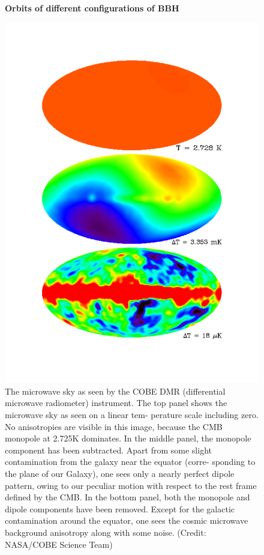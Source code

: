 \documentclass{article}
\begin{document}
\begin{figure}
\centering
    \textbf{Orbits of different  configurations of BBH}\par\medskip
\centering
\includegraphics[scale =0.3]{mono_di_cobe}
\caption{The microwave sky as seen by the COBE DMR (differential microwave radiometer) instrument. The top panel shows the microwave sky as seen on a linear tem- perature scale including zero. No anisotropies are visible in this image, because the CMB monopole at 2.725K dominates. In the middle panel, the monopole component has been subtracted. Apart from some slight contamination from the galaxy near the equator (corre- sponding to the plane of our Galaxy), one sees only a nearly perfect dipole pattern, owing to our peculiar motion with respect to the rest frame defined by the CMB. In the bottom panel, both the monopole and dipole components have been removed. Except for the galactic contamination around the equator, one sees the cosmic microwave background anisotropy along with some noise. (Credit: NASA/COBE Science Team)}
\label{cobe_map}
\end{figure}
\end{document}
